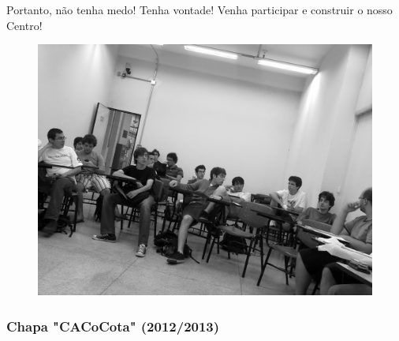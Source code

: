 Portanto, não tenha medo! Tenha vontade! Venha participar e construir o nosso
Centro!
\begin{figure}[t!]
    \centering
    \includegraphics[scale=0.47, keepaspectratio=true]{img/imgs/21-CACo/reuniao.jpg}
\end{figure}


\subsubsection{Chapa "CACoCota" (2012/2013)}

